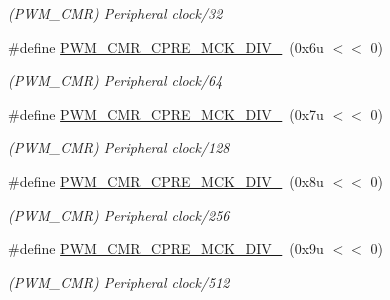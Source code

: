 \begin{DoxyCompactItemize}
\begin{DoxyCompactList}\small\item\em (P\+W\+M\+\_\+\+C\+MR) Peripheral clock/32 \end{DoxyCompactList}\item 
\mbox{\label{group__SAMV71__PWM_gabf069ffac1c8b10527ca0aa9172007f7}} 
\#define \mbox{\hyperlink{group__SAMV71__PWM_gabf069ffac1c8b10527ca0aa9172007f7}{P\+W\+M\+\_\+\+C\+M\+R\+\_\+\+C\+P\+R\+E\+\_\+\+M\+C\+K\+\_\+\+D\+I\+V\+\_}}~(0x6u $<$$<$ 0)
\begin{DoxyCompactList}\small\item\em (P\+W\+M\+\_\+\+C\+MR) Peripheral clock/64 \end{DoxyCompactList}\item 
\mbox{\label{group__SAMV71__PWM_ga6a10a7bb26e066c5898b0e543488c024}} 
\#define \mbox{\hyperlink{group__SAMV71__PWM_ga6a10a7bb26e066c5898b0e543488c024}{P\+W\+M\+\_\+\+C\+M\+R\+\_\+\+C\+P\+R\+E\+\_\+\+M\+C\+K\+\_\+\+D\+I\+V\+\_}}~(0x7u $<$$<$ 0)
\begin{DoxyCompactList}\small\item\em (P\+W\+M\+\_\+\+C\+MR) Peripheral clock/128 \end{DoxyCompactList}\item 
\mbox{\label{group__SAMV71__PWM_ga9225f1847a5fd90ee574dcb2621d1837}} 
\#define \mbox{\hyperlink{group__SAMV71__PWM_ga9225f1847a5fd90ee574dcb2621d1837}{P\+W\+M\+\_\+\+C\+M\+R\+\_\+\+C\+P\+R\+E\+\_\+\+M\+C\+K\+\_\+\+D\+I\+V\+\_}}~(0x8u $<$$<$ 0)
\begin{DoxyCompactList}\small\item\em (P\+W\+M\+\_\+\+C\+MR) Peripheral clock/256 \end{DoxyCompactList}\item 
\mbox{\label{group__SAMV71__PWM_gab1f378d7d346306ac6c6db37fcbf3a4e}} 
\#define \mbox{\hyperlink{group__SAMV71__PWM_gab1f378d7d346306ac6c6db37fcbf3a4e}{P\+W\+M\+\_\+\+C\+M\+R\+\_\+\+C\+P\+R\+E\+\_\+\+M\+C\+K\+\_\+\+D\+I\+V\+\_}}~(0x9u $<$$<$ 0)
\begin{DoxyCompactList}\small\item\em (P\+W\+M\+\_\+\+C\+MR) Peripheral clock/512 \end{DoxyCompactList}\item 

\end{DoxyCompactItemize}

